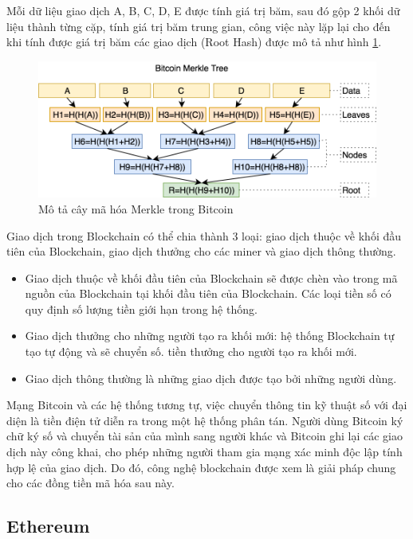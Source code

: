 Mỗi dữ liệu giao dịch A, B, C, D, E được tính giá trị băm, sau đó gộp 2 khối dữ liệu thành từng cặp, tính giá trị băm trung gian, công việc này lặp lại cho đến khi tính được giá trị băm các giao dịch (Root Hash) được mô tả như hình \ref{fig:merkle}. 

\begin{figure}[htbp]
\centering
\includegraphics[width=.9\linewidth]{img/merkle.png}
\caption{Mô tả cây mã hóa Merkle trong Bitcoin}
\label{fig:merkle}
\end{figure}

Giao dịch trong Blockchain có thể chia thành 3 loại: giao dịch  thuộc về khối đầu tiên của Blockchain, giao dịch thưởng cho các miner và giao dịch thông thường.

\begin{itemize}
\item Giao dịch thuộc về khối đầu tiên của Blockchain sẽ được chèn vào trong mã nguồn của Blockchain tại khối đầu tiên của Blockchain. Các loại tiền số có quy định số lượng tiền giới hạn trong hệ thống.
\item Giao dịch thưởng cho những người tạo ra khối mới: hệ thống Blockchain tự tạo tự động và sẽ chuyển số. tiền thưởng cho người tạo ra khối mới.
\item Giao dịch thông thường là những giao dịch được tạo bởi những người dùng. 
\end{itemize}

Mạng Bitcoin và các hệ thống tương tự, việc chuyển thông tin kỹ thuật số với đại diện là tiền điện tử diễn ra trong một hệ thống phân tán.
Người dùng Bitcoin ký chữ ký số và chuyển tài sản của mình sang người khác và Bitcoin ghi lại các giao dịch này công khai, cho phép những người tham gia mạng xác minh độc lập tính hợp lệ của giao dịch. 
Do đó, công nghệ blockchain được xem là giải pháp chung cho các đồng tiền mã hóa sau này.

\subsection{Ethereum}

